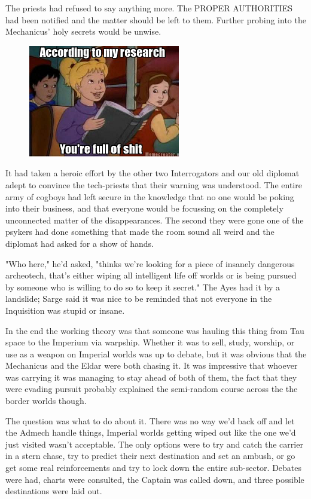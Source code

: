 The priests had refused to say anything more. 
The PROPER AUTHORITIES had been notified and the matter should be left to them. 
Further probing into the Mechanicus' holy secrets would be unwise.

\begin{figure}
	\begin{center}
		\includegraphics[width=\figwidth]{pics/11/36.png}
	\end{center}
\end{figure}
It had taken a heroic effort by the other two Interrogators and our old diplomat adept to convince the tech-priests that their warning was understood. 
The entire army of cogboys had left secure in the knowledge that no one would be poking into their business, and that everyone would be focussing on the completely unconnected matter of the disappearances. 
The second they were gone one of the psykers had done something that made the room sound all weird and the diplomat had asked for a show of hands. 


"Who here," he'd asked, "thinks we're looking for a piece of insanely dangerous archeotech, that's either wiping all intelligent life off worlds or is being pursued by someone who is willing to do so to keep it secret." The Ayes had it by a landslide; 
Sarge said it was nice to be reminded that not everyone in the Inquisition was stupid or insane.

In the end the working theory was that someone was hauling this thing from Tau space to the Imperium via warpship. 
Whether it was to sell, study, worship, or use as a weapon on Imperial worlds was up to debate, but it was obvious that the Mechanicus and the Eldar were both chasing it. 
It was impressive that whoever was carrying it was managing to stay ahead of both of them, the fact that they were evading pursuit probably explained the semi-random course across the the border worlds though.

The question was what to do about it. 
There was no way we'd back off and let the Admech handle things, Imperial worlds getting wiped out like the one we'd just visited wasn't acceptable. 
The only options were to try and catch the carrier in a stern chase, try to predict their next destination and set an ambush, or go get some real reinforcements and try to lock down the entire sub-sector. 
Debates were had, charts were consulted, the Captain was called down, and three possible destinations were laid out.

